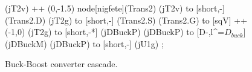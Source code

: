 \begin{figure}[htb]
\begin{center}
\begin{circuitikz}
                    (jT2v) ++ (0,-1.5) node[nigfete](Trans2){} 
                    (jT2v) to [short,-] (Trans2.D)
                    (jT2g) to [short,-] (Trans2.S)
                    (Trans2.G) to [sqV] ++(-1,0)
                    (jT2g) to [short,-*] (jDBuckP)
                    (jDBuckP) to  [D-,l^=$D_{buck}$] (jDBuckM)
                    (jDBuckP) to [short,-] (jU1g)
           ;
        \end{circuitikz}
    \end{center}
    \caption{Buck-Boost converter cascade.}
    \label{fig:step_down_with_load_resistor}
\end{figure}
